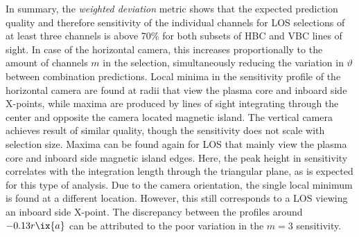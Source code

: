                 In summary, the \textit{weighted deviation} metric shows that the expected prediction quality and therefore sensitivity of the individual channels for LOS selections of at least three channels is above 70\% for both subsets of HBC and VBC lines of sight. In case of the horizontal camera, this increases proportionally to the amount of channels $m$ in the selection, simultaneously reducing the variation in $\vartheta$ between combination predictions. Local minima in the sensitivity profile of the horizontal camera are found at radii that view the plasma core and inboard side X-points, while maxima are produced by lines of sight integrating through the center and opposite the camera located magnetic island. The vertical camera achieves result of similar quality, though the sensitivity does not scale with selection size. Maxima can be found again for LOS that mainly view the plasma core and inboard side magnetic island edges. Here, the peak height in sensitivity correlates with the integration length through the triangular plane, as is expected for this type of analysis. Due to the camera orientation, the single local minimum is found at a different location. However, this still corresponds to a LOS viewing an inboard side X-point. The discrepancy between the profiles around $-0.13r\ix{a}$ can be attributed to the poor variation in the $m=3$ sensitivity.%
%
